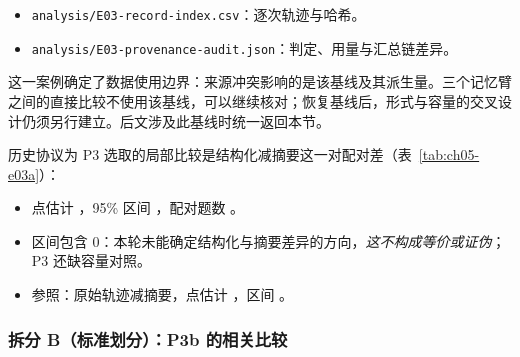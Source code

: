 \begin{itemize}
  \item \nolinkurl{analysis/E03-record-index.csv}：逐次轨迹与哈希。
  \item \nolinkurl{analysis/E03-provenance-audit.json}：判定、用量与汇总链差异。
\end{itemize}

这一案例确定了数据使用边界：来源冲突影响的是该基线及其派生量。三个记忆臂之间的直接比较不使用该基线，可以继续核对；恢复基线后，形式与容量的交叉设计仍须另行建立。后文涉及此基线时统一返回本节。

历史协议为 P3 选取的局部比较是结构化减摘要这一对配对差（表~\ref{tab:ch05-e03a}）：

\begin{itemize}
  \item 点估计 ，95\% 区间 \measured{[-0.1500, +0.1125]}，配对题数 。
  \item 区间包含 0：本轮未能确定结构化与摘要差异的方向，\emph{这不构成等价或证伪}；P3 还缺容量对照。
  \item 参照：原始轨迹减摘要，点估计 ，区间 \measured{[-0.0125, +0.2375]}。
\end{itemize}

\subsubsection{拆分 B（标准划分）：P3b 的相关比较}

